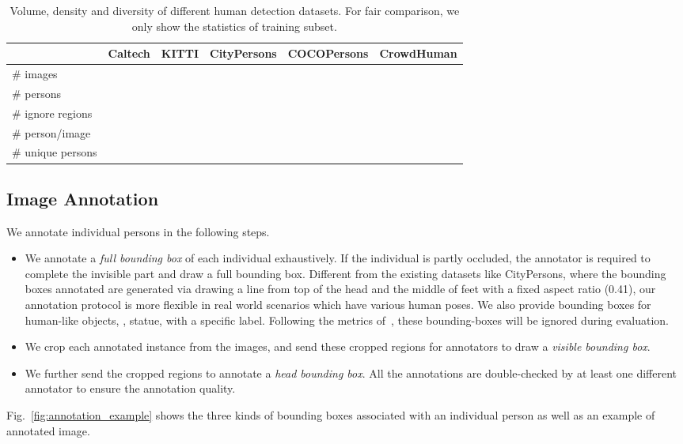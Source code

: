 \documentclass[10pt,twocolumn,letterpaper]{article}
\begin{document}
\begin{table*}[!ht]
\centering
\begin{tabular}{l|ccccc}
\hline
\hline
 & Caltech & KITTI & CityPersons & COCOPersons & CrowdHuman \\
\hline
\# images &  &  &  &  &  \\
\# persons &  &  &  &  &  \\
\# ignore regions &  &  &  &  &  \\
\# person/image &  &  &  &  &  \\
\# unique persons &  &  &  &  &  \\
\hline
\end{tabular}
\caption{\label{tab:dataset_statistics} Volume, density and diversity of different human detection datasets. For fair comparison, we only show the statistics of training subset.}
\end{table*}


\subsection{Image Annotation}
We annotate individual persons in the following steps. 
\begin{itemize}
    \item We annotate a \emph{full bounding box} of each individual exhaustively. If the individual is partly occluded, the annotator is required to complete the invisible part and draw a full bounding box. Different from the existing datasets like CityPersons, where the bounding boxes annotated are generated via drawing a line from top of the head and the middle of feet with a fixed aspect ratio (0.41), our annotation protocol is more flexible in real world scenarios which have various human poses. We also provide bounding boxes for human-like objects, \eg, statue, with a specific label. Following the metrics of~\cite{dollar2009pedestrian}, these bounding-boxes will be ignored during evaluation.
    \item We crop each annotated instance from the images, and send these cropped regions for annotators to draw a \emph{visible bounding box}.
    \item We further send the cropped regions to annotate a \emph{head bounding box}. All the annotations are double-checked by at least one different annotator to ensure the annotation quality.
\end{itemize}
Fig.~\ref{fig:annotation_example} shows the three kinds of bounding boxes associated with an individual person as well as an example of annotated image. 
\end{document}
